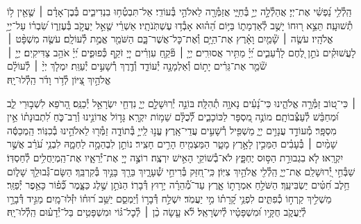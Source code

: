 \documentclass[twoside, openany, parskip=half, 11pt]{book}
\begin{document}
הַֽלְ֯לִ֥י נַ֝פְשִׁ֗י אֶת־יְיָ׃
אֲהַלְ֯לָ֣ה יְיָ֣ בְּ֯חַיָּ֑י אֲזַמְּ֯רָ֖ה לֵאלֹהַ֣י בְּ֯עוֹדִֽי׃
אַל־תִּבְטְ֯ח֥וּ בִנְדִיבִ֑ים בְּ֯בֶן־אָדָ֓ם ׀ שֶׁ֤אֵ֖ין ל֥וֹ תְ֯שׁוּעָֽה׃
תֵּצֵ֣א ר֭וּחוֹ יָשֻׁ֣ב לְ֯אַדְמָת֑וֹ בַּיּ֥וֹם הַ֝ה֗וּא אָבְ֯ד֥וּ עֶשְׁתֹּֽנֹתָֽיו׃
אַשְׁרֵ֗י שֶׁ֤אֵ֣ל יַעֲקֹ֣ב בְּ֯עֶזְר֑וֹ שִׂ֝בְר֗וֹ עַל־יְיָ֥ אֱלֹהָֽיו׃
עֹשֶׂ֤ה ׀ שָׁ֘מַ֤יִם וָאָ֗רֶץ אֶת־הַיָּ֥ם וְ֯אֶת־כׇּל־אֲשֶׁר־בָּ֑ם הַשֹּׁמֵ֖ר אֱמֶ֣ת לְ֯עוֹלָֽם׃
עֹשֶׂ֤ה מִשְׁפָּ֨ט ׀ לָעֲשׁוּקִ֗ים נֹתֵ֣ן לֶ֭חֶם לָרְ֯עֵבִ֑ים יְ֝יָ֗ מַתִּ֥יר אֲסוּרִֽים׃
יְיָ֤ ׀ פֹּ֘קֵ֤חַ עִוְרִ֗ים יְיָ֭ זֹקֵ֣ף כְּ֯פוּפִ֑ים יְ֝יָ֗ אֹהֵ֥ב צַדִּיקִֽים׃
יְיָ֤ ׀ שֹׁ֘מֵ֤ר אֶת־גֵּרִ֗ים יָת֣וֹם וְ֯אַלְמָנָ֣ה יְ֯עוֹדֵ֑ד וְ֯דֶ֖רֶךְ רְ֯שָׁעִ֣ים יְ֯עַוֵּֽת׃
יִמְלֹ֤ךְ יְיָ֨ ׀ לְ֯עוֹלָ֗ם\\ אֱלֹהַ֣יִךְ צִ֭יּוֹן לְ֯דֹ֥ר וָדֹ֗ר הַֽלְ֯לוּ־יָֽהּ׃



 ׀
כִּי־ט֭וֹב זַמְּ֯רָ֣ה אֱלֹהֵ֑ינוּ כִּי־נָ֝עִ֗ים נָאוָ֥ה תְ֯הִלָּֽה׃
בּוֹנֵ֣ה יְ֯רֽוּשָׁלַ֣‍ִם יְיָ֑ נִדְחֵ֖י יִשְׂרָאֵ֣ל יְ֯כַנֵּֽס׃
הָ֭רֹפֵא לִשְׁב֣וּרֵי לֵ֑ב וּ֝מְחַבֵּ֗שׁ לְ֯עַצְּ֯בוֹתָֽם׃
מוֹנֶ֣ה מִ֭סְפָּר לַכּוֹכָבִ֑ים לְ֯֝כֻלָּ֗ם שֵׁמ֥וֹת יִקְרָֽא׃
גָּד֣וֹל אֲדוֹנֵ֣ינוּ וְ֯רַב־כֹּ֑חַ לִ֝תְבוּנָת֗וֹ אֵ֣ין מִסְפָּֽר׃
מְ֯עוֹדֵ֣ד עֲנָוִ֣ים יְיָ֑ מַשְׁפִּ֖יל רְ֯שָׁעִ֣ים עֲדֵי־אָֽרֶץ׃
עֱנ֣וּ לַֽייָ֣ בְּ֯תוֹדָ֑ה זַמְּ֯ר֖וּ לֵאלֹהֵ֣ינוּ בְ֯כִנּֽוֹר׃
הַֽמְכַסֶּ֬ה שָׁמַ֨יִם ׀ בְּ֯עָבִ֗ים הַמֵּכִ֣ין לָאָ֣רֶץ מָטָ֑ר הַמַּצְמִ֖יחַ הָרִ֣ים חָצִֽיר׃
נוֹתֵ֣ן לִבְהֵמָ֣ה לַחְמָ֑הּ לִבְנֵ֥י עֹ֝רֵ֗ב אֲשֶׁ֣ר יִקְרָֽאוּ׃
לֹ֤א בִגְבוּרַ֣ת הַסּ֣וּס יֶחְפָּ֑ץ לֹא־בְ֯שׁוֹקֵ֖י הָאִ֣ישׁ יִרְצֶֽה׃
רוֹצֶ֣ה יְיָ֭ אֶת־יְ֯רֵאָ֑יו אֶת־הַֽמְיַחֲלִ֥ים לְ֯חַסְדּֽוֹ׃
שַׁבְּ֯חִ֣י יְ֭֯רוּשָׁלַ‍ִם אֶת־יְיָ֑ הַֽלְ֯לִ֖י אֱלֹהַ֣יִךְ צִיּֽוֹן׃
כִּֽי־חִ֭זַּק בְּ֯רִיחֵ֣י שְׁ֯עָרָ֑יִךְ בֵּרַ֖ךְ בָּנַ֣יִךְ בְּ֯קִרְבֵּֽךְ׃
הַשָּׂם־גְּ֯בוּלֵ֥ךְ שָׁל֑וֹם חֵ֥לֶב חִ֝טִּ֗ים יַשְׂבִּיעֵֽךְ׃
הַשֹּׁלֵ֣חַ אִמְרָת֣וֹ אָ֑רֶץ עַד־מְ֯֝הֵרָ֗ה יָר֥וּץ דְּ֯בָרֽוֹ׃
הַנֹּתֵ֣ן שֶׁ֣לֶג כַּצָּ֑מֶר כְּ֯֝פ֗וֹר כָּאֵ֥פֶר יְ֯פַזֵּֽר׃
מַשְׁלִ֣יךְ קַֽרְח֣וֹ כְ֯פִתִּ֑ים לִפְנֵ֥י קָ֝רָת֗וֹ מִ֣י יַעֲמֹֽד׃
יִשְׁלַ֣ח דְּ֯בָר֣וֹ וְ֯יַמְסֵ֑ם יַשֵּׁ֥ב ר֝וּח֗וֹ יִזְּ֯לוּ־מָֽיִם׃
מַגִּ֣יד דְּ֯בָרָ֣ו לְ֯יַעֲקֹ֑ב חֻקָּ֥יו וּ֝מִשְׁפָּטָ֗יו לְ֯יִשְׂרָאֵֽל׃
לֹ֘א עָ֤שָׂה כֵ֨ן ׀ לְ֯כׇל־גּ֗וֹי וּמִשְׁפָּטִ֥ים בַּל־יְ֯דָע֗וּם הַֽלְ֯לוּ־יָֽהּ׃
\end{document}
